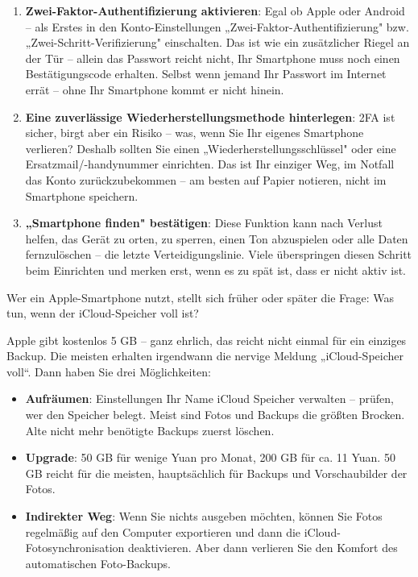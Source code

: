 \begin{enumerate}
  \item \textbf{Zwei-Faktor-Authentifizierung aktivieren}: Egal ob Apple oder Android – als Erstes in den Konto-Einstellungen „Zwei-Faktor-Authentifizierung" bzw. „Zwei-Schritt-Verifizierung" einschalten. Das ist wie ein zusätzlicher Riegel an der Tür – allein das Passwort reicht nicht, Ihr Smartphone muss noch einen Bestätigungscode erhalten. Selbst wenn jemand Ihr Passwort im Internet errät – ohne Ihr Smartphone kommt er nicht hinein.
  \item \textbf{Eine zuverlässige Wiederherstellungsmethode hinterlegen}: 2FA ist sicher, birgt aber ein Risiko – was, wenn Sie Ihr eigenes Smartphone verlieren? Deshalb sollten Sie einen „Wiederherstellungsschlüssel" oder eine Ersatzmail/-handynummer einrichten. Das ist Ihr einziger Weg, im Notfall das Konto zurückzubekommen – am besten auf Papier notieren, nicht im Smartphone speichern.
  \item \textbf{„Smartphone finden" bestätigen}: Diese Funktion kann nach Verlust helfen, das Gerät zu orten, zu sperren, einen Ton abzuspielen oder alle Daten fernzulöschen – die letzte Verteidigungslinie. Viele überspringen diesen Schritt beim Einrichten und merken erst, wenn es zu spät ist, dass er nicht aktiv ist.
\end{enumerate}


Wer ein Apple-Smartphone nutzt, stellt sich früher oder später die Frage: Was tun, wenn der iCloud-Speicher voll ist?

Apple gibt kostenlos 5 GB – ganz ehrlich, das reicht nicht einmal für ein einziges Backup. Die meisten erhalten irgendwann die nervige Meldung „iCloud-Speicher voll“. Dann haben Sie drei Möglichkeiten:

\begin{itemize}
  \item \textbf{Aufräumen}: Einstellungen Ihr Name iCloud Speicher verwalten – prüfen, wer den Speicher belegt. Meist sind Fotos und Backups die größten Brocken. Alte nicht mehr benötigte Backups zuerst löschen.
  \item \textbf{Upgrade}: 50 GB für wenige Yuan pro Monat, 200 GB für ca. 11 Yuan. 50 GB reicht für die meisten, hauptsächlich für Backups und Vorschaubilder der Fotos.
  \item \textbf{Indirekter Weg}: Wenn Sie nichts ausgeben möchten, können Sie Fotos regelmäßig auf den Computer exportieren und dann die iCloud-Fotosynchronisation deaktivieren. Aber dann verlieren Sie den Komfort des automatischen Foto-Backups.
\end{itemize}

